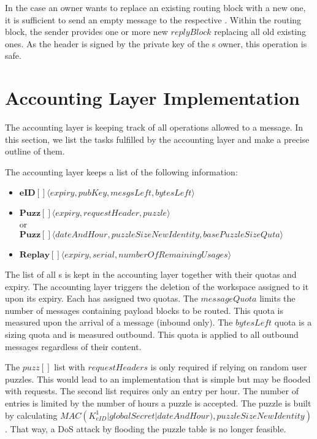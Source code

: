 In the case an owner wants to replace an existing routing block with a new one, it is sufficient to send an empty message to the respective . Within the routing block, the sender provides one or more new $replyBlock$ replacing all old existing ones. As the header is signed by the private key of the s owner, this operation is safe.

\chapter{Accounting Layer Implementation}\label{sec:accountingImplementation}
The accounting layer is keeping track of all operations allowed to a message. In this section, we list the tasks fulfilled by the accounting layer and make a precise outline of them.

The accounting layer keeps a list of the following information:
\begin{itemize}
	\item $\mathbf{eID[]}\langle expiry, pubKey, mesgsLeft, bytesLeft \rangle$\\
	\item $\mathbf{Puzz[]}\langle expiry, requestHeader, puzzle \rangle$\\
	or\\
	$\mathbf{Puzz[]}\langle dateAndHour, puzzleSizeNewIdentity, basePuzzleSizeQuta \rangle$\\
	\item $\mathbf{Replay[]}\langle expiry, serial, numberOfRemainingUsages \rangle$\\
\end{itemize}

The list of all s is kept in the accounting layer together with their quotas and expiry. The accounting layer triggers the deletion of the workspace assigned to it upon its expiry. Each  has assigned two quotas. The $messageQuota$ limits the number of messages containing payload blocks to be routed. This quota is measured upon the arrival of a message (inbound only). The $bytesLeft$ quota is a sizing quota and is measured outbound. This quota is applied to all outbound messages regardless of their content.

The $puzz[]$ list with $requestHeaders$ is only required if relying on random user puzzles. This would lead to an implementation that is simple but may be flooded with  requests. The second list requires only an entry per hour. The number of entries is limited by the number of hours a puzzle is accepted. The puzzle is built by calculating  $MAC\left(K^1_{eID} | globalSecret | dateAndHour ), puzzleSizeNewIdentity\right)$. That way, a DoS attack by flooding the puzzle table is no longer feasible.

